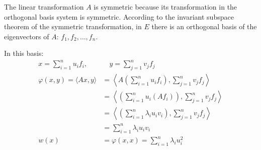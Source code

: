 The linear transformation $A$ is symmetric because its transformation in the orthogonal basis system is symmetric. According to the invariant subspace theorem of the symmetric transformation, in $E$ there is an orthogonal basis of the eigenvectors of $A$: $f_1, f_2, \ldots, f_n$.

In this basis:
\begin{align*}
    x = \sum_{i=1}^n u_i f_i, &\quad y = \sum_{j=1}^n v_j f_j\\
    \varphi(x, y) = \langle Ax, y \rangle 
    &= \left\langle A \left(\sum_{i=1}^n u_i f_i\right), \sum_{j=1}^n v_j f_j \right\rangle\\
    &= \left\langle \left(\sum_{i=1}^n u_i (Af_i)\right), \sum_{j=1}^n v_j f_j \right\rangle\\
    &= \left\langle \left(\sum_{i=1}^n \lambda_i u_i v_i\right), \sum_{j=1}^n v_j f_j \right\rangle\\
    &= \sum_{i=1}^n \lambda_i u_i v_i\\
    w(x) &= \varphi(x, x) = \sum_{i=1}^n \lambda_i u_i^2\\
\end{align*}

